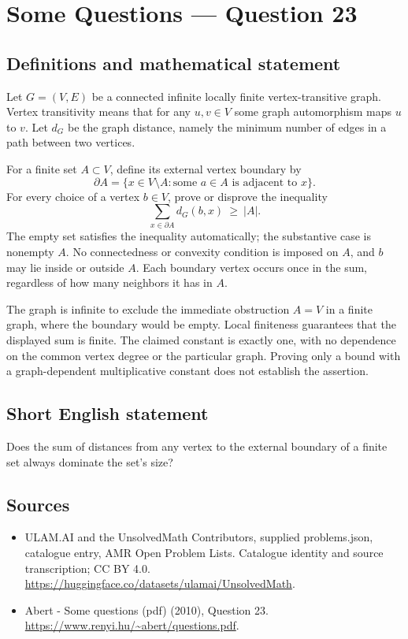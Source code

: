 \documentclass[11pt,a4paper]{article}
\begin{document}
\section*{Some Questions — Question 23}\label{statement}

\subsection{Definitions and mathematical statement}
Let $G=(V,E)$ be a connected infinite locally finite vertex-transitive graph. Vertex transitivity means that for any $u,v\in V$ some graph automorphism maps $u$ to $v$. Let $d_G$ be the graph distance, namely the minimum number of edges in a path between two vertices.

For a finite set $A\subset V$, define its external vertex boundary by
\[
 \partial A=\{x\in V\setminus A:\text{some }a\in A\text{ is adjacent to }x\}.
\]
For every choice of a vertex $b\in V$, prove or disprove the inequality
\[
 \sum_{x\in\partial A}d_G(b,x)\ \geq\ |A|.
\]
The empty set satisfies the inequality automatically; the substantive case is nonempty $A$. No connectedness or convexity condition is imposed on $A$, and $b$ may lie inside or outside $A$. Each boundary vertex occurs once in the sum, regardless of how many neighbors it has in $A$.

The graph is infinite to exclude the immediate obstruction $A=V$ in a finite graph, where the boundary would be empty. Local finiteness guarantees that the displayed sum is finite. The claimed constant is exactly one, with no dependence on the common vertex degree or the particular graph. Proving only a bound with a graph-dependent multiplicative constant does not establish the assertion.
\subsection{Short English statement}
Does the sum of distances from any vertex to the external boundary of a finite set always dominate the set’s size?
\subsection{Sources}
\begin{itemize}
\item[S1] ULAM.AI and the UnsolvedMath Contributors, supplied problems.json, catalogue entry, AMR Open Problem Lists. Catalogue identity and source transcription; CC BY 4.0.
\url{https://huggingface.co/datasets/ulamai/UnsolvedMath}.
\item[S2] Abert - Some questions (pdf) (2010), Question 23. 
\url{https://www.renyi.hu/~abert/questions.pdf}.
\end{itemize}
\end{document}
